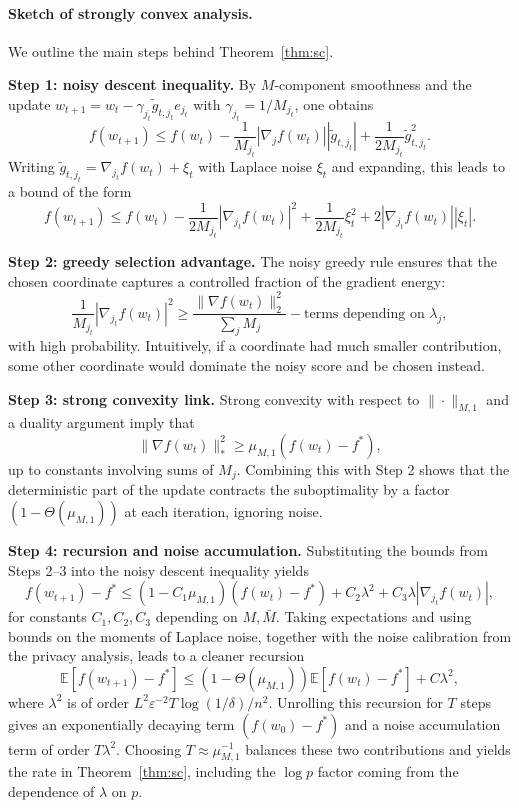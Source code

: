 \documentclass[11pt,a4paper]{article}
\begin{document}
\paragraph{Sketch of strongly convex analysis.} We outline the main steps behind Theorem~\ref{thm:sc}.

\textbf{Step 1: noisy descent inequality.} By $M$-component smoothness and the update $w_{t+1} = w_t - \gamma_{j_t} \tilde{g}_{t,j_t} e_{j_t}$ with $\gamma_{j_t} = 1/M_{j_t}$, one obtains
\[
f(w_{t+1}) \leq f(w_t) - \frac{1}{M_{j_t}} |\nabla_j f(w_t)| |\tilde{g}_{t,j_t}| + \frac{1}{2M_{j_t}} \tilde{g}_{t,j_t}^2.
\]
Writing $\tilde{g}_{t,j_t} = \nabla_{j_t} f(w_t) + \xi_t$ with Laplace noise $\xi_t$ and expanding, this leads to a bound of the form
\[
f(w_{t+1}) \leq f(w_t) - \frac{1}{2M_{j_t}} |\nabla_{j_t} f(w_t)|^2 + \frac{1}{2M_{j_t}} \xi_t^2 + 2|\nabla_{j_t} f(w_t)| |\xi_t|.
\]

\textbf{Step 2: greedy selection advantage.} The noisy greedy rule ensures that the chosen coordinate captures a controlled fraction of the gradient energy:
\[
\frac{1}{M_{j_t}} |\nabla_{j_t} f(w_t)|^2 \geq \frac{\|\nabla f(w_t)\|_2^2}{\sum_j M_j} - \text{terms depending on } \lambda_j,
\]
with high probability. Intuitively, if a coordinate had much smaller contribution, some other coordinate would dominate the noisy score and be chosen instead.

\textbf{Step 3: strong convexity link.} Strong convexity with respect to $\|\cdot\|_{M,1}$ and a duality argument imply that
\[
\|\nabla f(w_t)\|_*^2 \geq \mu_{M,1} (f(w_t) - f^*),
\]
up to constants involving sums of $M_j$. Combining this with Step 2 shows that the deterministic part of the update contracts the suboptimality by a factor $(1 - \Theta(\mu_{M,1}))$ at each iteration, ignoring noise.

\textbf{Step 4: recursion and noise accumulation.} Substituting the bounds from Steps 2--3 into the noisy descent inequality yields
\[
f(w_{t+1}) - f^* \leq (1 - C_1 \mu_{M,1})(f(w_t) - f^*) + C_2 \lambda^2 + C_3 \lambda |\nabla_{j_t} f(w_t)|,
\]
for constants $C_1, C_2, C_3$ depending on $M, \bar{M}$. Taking expectations and using bounds on the moments of Laplace noise, together with the noise calibration from the privacy analysis, leads to a cleaner recursion
\[
\mathbb{E}[f(w_{t+1}) - f^*] \leq (1 - \Theta(\mu_{M,1})) \mathbb{E}[f(w_t) - f^*] + C \lambda^2,
\]
where $\lambda^2$ is of order $L^2 \varepsilon^{-2} T \log(1/\delta)/n^2$. Unrolling this recursion for $T$ steps gives an exponentially decaying term $(f(w_0) - f^*)$ and a noise accumulation term of order $T \lambda^2$. Choosing $T \approx \mu_{M,1}^{-1}$ balances these two contributions and yields the rate in Theorem~\ref{thm:sc}, including the $\log p$ factor coming from the dependence of $\lambda$ on $p$.
\end{document}

